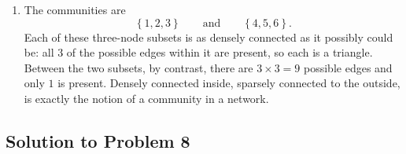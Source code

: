 \documentclass[a4paper,12pt]{article}
\begin{document}
\begin{enumerate}[label=(\alph*)]
\item The communities are
\[ \left\{ 1,2,3 \right\} \qquad\text{and}\qquad \left\{ 4,5,6 \right\} . \]
Each of these three-node subsets is as densely connected as it possibly could be: all $3$ of the possible edges within it are present, so each is a triangle. Between the two subsets, by contrast, there are $3 \times 3 = 9$ possible edges and only $1$ is present. Densely connected inside, sparsely connected to the outside, is exactly the notion of a community in a network.

\end{enumerate}

\subsection*{Solution to Problem 8}
\end{document}
